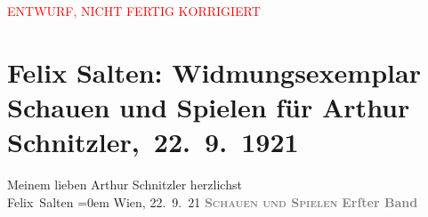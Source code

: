
\begin{center}
            \textcolor{red}{ENTWURF, NICHT FERTIG KORRIGIERT}
                      \end{center}
            
         
         \renewcommand{\erwaehntePersonen}{Personen: Felix Salten}
         \renewcommand{\erwaehnteInstitutionen}{Institutionen: Wiener Literarische Anstalt}
         \renewcommand{\erwaehnteOrte}{Orte: Leipzig, Wien}
         \renewcommand{\erwaehnteWerke}{Werke: Schauen und Spielen. Studien zur Kritik des modernen Theaters, Schauen und Spielen. Studien zur Kritik des modernen Theaters. Erster Band. Ergebnisse Erlebnisse}
               \section[ Felix Salten: Widmungsexemplar Schauen und Spielen für Arthur Schnitzler, 22. 9. 1921]{ Felix Salten: Widmungsexemplar Schauen und Spielen für Arthur
               Schnitzler, 22. 9. 1921}\nopagebreak{}\rehead{ }\begin{ledgroupsized}[t]{13cm}\normalsize\beginnumbering \toendnotes[C]{\smallbreak\pagebreak[2]} 
\pstart
           \noindent{}{\pb}Meinem lieben Arthur Schnitzler\pend
           \pstart
           herzlichst {\\[\baselineskip]}\spacefill\mbox{Felix Salten}\pend
           \leftskip=0em{}\pstart
           Wien, 22. 9. 21\pend
           {\bigskip}\pstart
           \noindent{}\centering{}\textcolor{gray}{\textbf{}}\pend
           \pstart
           \noindent{}\centering{}\textcolor{gray}{\textbf{\textsc{\textbf{Schauen und Spielen}}}}\pend
           \pstart
           \noindent{}\centering{}\textcolor{gray}{\textbf{Erſter Band}}\pend
           \pstart
           \noindent{}\centering{}\textcolor{gray}{\textbf{}}
\end{ledgroupsized}
